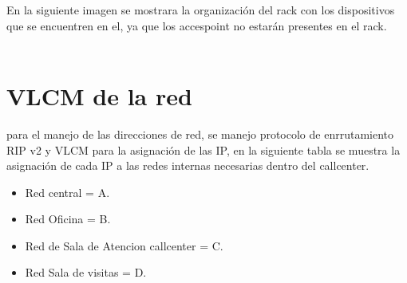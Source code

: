 \documentclass[12pt]{article}
\begin{document}
En la siguiente imagen se mostrara la organización del rack con los dispositivos que se encuentren en el, ya que los accespoint no estarán presentes en el rack.\\\\
\begin{center}
\end{center}

\pagebreak
\section{\textbf{VLCM de la red}}
para el manejo de las direcciones de red, se manejo protocolo de enrrutamiento RIP v2 y VLCM para la asignación de las IP, en la siguiente tabla se muestra la asignación de cada IP a las redes internas necesarias dentro del callcenter.

\begin{itemize}
\item
Red central = A.
\item
Red Oficina = B.
\item
Red de Sala de Atencion callcenter = C.
\item
Red Sala de visitas = D.
\end{itemize}
\end{document}
